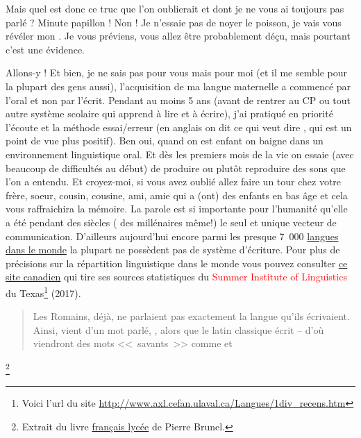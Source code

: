Mais quel est donc ce truc  que l'on oublierait et dont je
ne vous ai toujours pas parlé ? Minute papillon ! Non ! Je n'essaie
pas de noyer le poisson, je vais vous révéler mon . Je vous
préviens, vous allez être probablement déçu, mais pourtant c'est une
évidence. \par
Allons-y ! Et bien, je ne sais pas pour vous mais pour moi (et il me
semble pour la plupart des gens aussi), l'acquisition de ma langue
maternelle a commencé par l'oral et non par l'écrit. Pendant au moins
5 ans (avant de rentrer au CP ou tout autre système scolaire qui
apprend à lire et à écrire), j'ai pratiqué en priorité l'écoute et la
méthode essai/erreur (en anglais on dit  ce qui veut
dire , qui est un point de vue plus positif). Ben
oui, quand on est enfant on baigne dans un environnement linguistique
oral. Et dès les premiers mois de la vie on essaie (avec beaucoup de
difficultés au début) de produire ou plutôt reproduire des sons que
l'on a entendu. Et croyez-moi, si vous avez oublié allez faire un tour
chez votre frère, soeur, cousin, cousine, ami, amie qui a (ont) des
enfants en bas âge et cela vous raffraichira la mémoire. La parole est
si importante pour l'humanité qu'elle a été pendant des siècles ( des
millénaires même!) le seul et unique vecteur de
communication. D'ailleurs aujourd'hui encore parmi les presque 7~000
\href{http://www.museedelhomme.fr/fr/combien-langues-sont-parlees-monde}{langues dans le monde} la plupart ne possèdent pas de système
d'écriture. Pour plus de précisions sur la répartition linguistique
dans le monde vous pouvez consulter \href{http://www.axl.cefan.ulaval.ca/Langues/1div\_recens.htm}{ce site canadien} qui tire ses
sources statistiques du \textcolor{red}{Summer Institute of Linguistics} du
Texas\footnote{Voici l'url du site
  \url{http://www.axl.cefan.ulaval.ca/Langues/1div_recens.htm}}
(2017).\par


\begin{quote}
Les Romains, déjà, ne parlaient pas exactement la langue qu'ils
écrivaient. Ainsi,  vient d'un mot parlé, , alors
que le latin classique écrit  -- d'où viendront des mots <<~savants~>> comme  et 
\end{quote}\footnote{Extrait du livre \href{https://www.amazon.fr/gp/product/2844100015/ref=as\_li\_tl?ie=UTF8\&camp=1642\&creative=6746\&creativeASIN=2844100015\&linkCode=as2\&tag=wwwbecomefree-21\&linkId=985f3a849fd44728e8480993cf2d5490}{français lycée} de Pierre Brunel.}

